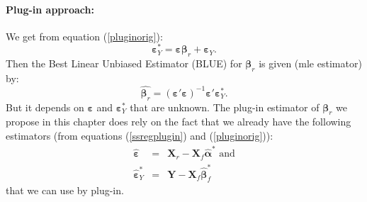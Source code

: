 \documentclass[12pt,a4paper]{report}
\begin{document}
\paragraph{Plug-in approach:}
We get from equation (\ref{pluginorig}):%
\begin{equation}
	\boldsymbol{\varepsilon}_Y^*%
	=\boldsymbol{\varepsilon}\boldsymbol{\beta}_r+\boldsymbol{\varepsilon}_Y. \label{eq:regplugin} 
\end{equation}
Then the Best Linear Unbiased Estimator ({\sc BLUE}) for $\boldsymbol{\beta}_r$ is given ({\sc mle} estimator) by:
\begin{equation}
  \hat{\boldsymbol{\beta}_r}=(\boldsymbol{\varepsilon}'\boldsymbol{\varepsilon})^{-1}\boldsymbol{\varepsilon}'\boldsymbol{\varepsilon}_Y^* . \label{olsplugin}
\end{equation}
    But it depends on $\boldsymbol{\varepsilon}$ and $\boldsymbol{\varepsilon}_Y^*$ that are unknown.
The plug-in estimator of $\boldsymbol{\beta}_r$ we propose in this chapter does rely on the fact that we already have the following estimators (from equations (\ref{ssregplugin}) and (\ref{pluginorig})):
	\begin{eqnarray}
		\hat{\boldsymbol{\varepsilon}}&=& \boldsymbol{X}_r-\boldsymbol{X}_f\hat{\boldsymbol{\alpha}}^* \nonumber \textrm{ and} \\
		\hat{\boldsymbol{\varepsilon}}_Y^*&=&\boldsymbol{Y}-\boldsymbol{X}_f\hat{\boldsymbol{\beta}}_f^* \nonumber
	\end{eqnarray}
	that we can use by plug-in.%
\end{document}
